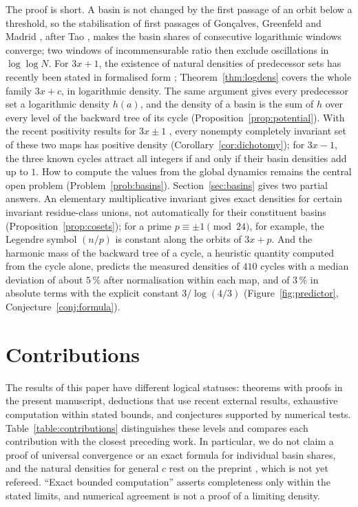 \documentclass[12pt]{amsart}
\theoremstyle{definition}
\theoremstyle{remark}
\begin{document}
The proof is short. A basin is not changed by the first passage of an orbit below a threshold, so the stabilisation of first passages of Gon\c{c}alves, Greenfeld and Madrid \cite{GGM_2025}, after Tao \cite{Tao_2022}, makes the basin shares of consecutive logarithmic windows converge; two windows of incommensurable ratio then exclude oscillations in $\log\log N$. For $3x+1$, the existence of natural densities of predecessor sets has recently been stated in formalised form \cite{CLT_2026}; Theorem~\ref{thm:logdens} covers the whole family $3x+c$, in logarithmic density. The same argument gives every predecessor set a logarithmic density $h(a)$, and the density of a basin is the sum of $h$ over every level of the backward tree of its cycle (Proposition~\ref{prop:potential}). With the recent positivity results for $3x\pm1$ \cite{Mazur_Pred_2026,ElJaouhari_2026}, every nonempty completely invariant set of these two maps has positive density (Corollary~\ref{cor:dichotomy}); for $3x-1$, the three known cycles attract all integers if and only if their basin densities add up to $1$. How to compute the values from the global dynamics remains the central open problem (Problem~\ref{prob:basins}). Section~\ref{sec:basins} gives two partial answers. An elementary multiplicative invariant gives exact densities for certain invariant residue-class unions, not automatically for their constituent basins (Proposition~\ref{prop:cosets}); for a prime $p\equiv\pm1\pmod{24}$, for example, the Legendre symbol $(n/p)$ is constant along the orbits of $3x+p$. And the harmonic mass of the backward tree of a cycle, a heuristic quantity computed from the cycle alone, predicts the measured densities of $410$ cycles with a median deviation of about $5\,\%$ after normalisation within each map, and of $3\,\%$ in absolute terms with the explicit constant $3/\log(4/3)$ (Figure~\ref{fig:predictor}, Conjecture~\ref{conj:formula}).

\section{Contributions}
\label{sec:contributions}
The results of this paper have different logical statuses: theorems with proofs
in the present manuscript, deductions that use recent external results,
exhaustive computation within stated bounds, and conjectures supported by
numerical tests. Table~\ref{table:contributions} distinguishes these levels
and compares each contribution with the closest preceding work. In particular,
we do not claim a proof of universal convergence or an exact formula for
individual basin shares, and the natural densities for general $c$ rest on
the preprint \cite{Allikvere_2026}, which is not yet refereed. ``Exact bounded
computation'' asserts completeness only within the stated limits, and numerical
agreement is not a proof of a limiting density.
\end{document}
